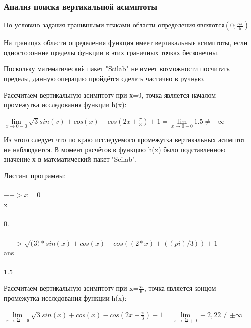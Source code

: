\documentclass[russian,utf8,nocolumnxxxi,nocolumnxxxii]{eskdtext}
\begin{document}
\subsubsection{Анализ поиска вертикальной асимптоты}

По условию задания граничными точками области определения являются$(0;\frac{5\pi}{6})$

На границах области определения функция имеет вертикальные асимптоты, если односторонние пределы функции в этих граничных точках бесконечны.

Поскольку математический пакет "Scilab" не имеет возможности посчитать пределы, данную операцию пройдётся сделать частично в ручную.



Рассчитаем вертикальную асимптоту при х=0, точка является началом промежутка исследования функции h(x):

\begin{center}

$\lim\limits_{x\to{0-0}}\sqrt{3}sin(x)+cos(x)-cos(2x+\frac{\pi}{3})+1=\lim\limits_{x\to{0-0}}1.5\neq\pm\infty$

\end{center}

Из этого следует что по краю исследуемого промежутка вертикальных асимптот не наблюдается.
В момент расчётов в функцию h(x) было подставленною значение х в математический пакет "Scilab".

Листинг программы:
\\
\\$-->x=0$
\\ x  =
\\

\\$0.$
\\
\\$-->\sqrt(3)*sin(x)+cos(x)-cos((2*x) + ((pi)/3))+1$
\\ ans  =
\\

\\$1.5$

Рассчитаем вертикальную асимптоту при x=$\frac{5\pi}{6}$, точка является концом промежутка исследования функции h(x):

\begin{center}

$\lim\limits_{x\to{\frac{5\pi}{6}+0}}\sqrt{3}sin(x)+cos(x)-cos(2x+\frac{\pi}{3})+1=\lim\limits_{x\to{\frac{5\pi}{6}+0}}-2,22\neq\pm\infty$

\end{center}
\end{document}
